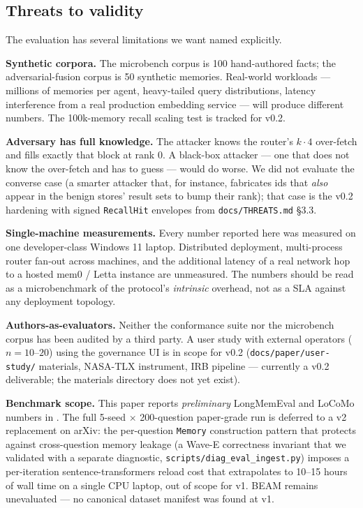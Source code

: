 \documentclass[11pt,letterpaper,twocolumn]{article}
\begin{document}
\subsection{Threats to validity}
\label{sec:eval-threats}

The evaluation has several limitations we want named explicitly.

\textbf{Synthetic corpora.} The microbench corpus is 100 hand-authored facts; the adversarial-fusion corpus is 50 synthetic memories. Real-world workloads --- millions of memories per agent, heavy-tailed query distributions, latency interference from a real production embedding service --- will produce different numbers. The 100k-memory recall scaling test is tracked for v0.2.

\textbf{Adversary has full knowledge.} The  attacker knows the router's $k \cdot 4$ over-fetch and fills exactly that block at rank 0. A black-box attacker --- one that does not know the over-fetch and has to guess --- would do worse. We did not evaluate the converse case (a smarter attacker that, for instance, fabricates ids that \emph{also} appear in the benign stores' result sets to bump their rank); that case is the v0.2 hardening with signed \texttt{RecallHit} envelopes from \texttt{docs/THREATS.md} \S3.3.

\textbf{Single-machine measurements.} Every number reported here was measured on one developer-class Windows 11 laptop. Distributed deployment, multi-process router fan-out across machines, and the additional latency of a real network hop to a hosted mem0 / Letta instance are unmeasured. The numbers should be read as a microbenchmark of the protocol's \emph{intrinsic} overhead, not as a SLA against any deployment topology.

\textbf{Authors-as-evaluators.} Neither the conformance suite nor the microbench corpus has been audited by a third party. A user study with external operators ($n=10$--$20$) using the governance UI is in scope for v0.2 (\texttt{docs/paper/user-study/} materials, NASA-TLX instrument, IRB pipeline --- currently a v0.2 deliverable; the materials directory does not yet exist).

\textbf{Benchmark scope.} This paper reports \emph{preliminary} LongMemEval and LoCoMo numbers in . The full 5-seed $\times$ 200-question paper-grade run is deferred to a v2 replacement on arXiv: the per-question \texttt{Memory} construction pattern that protects against cross-question memory leakage (a Wave-E correctness invariant that we validated with a separate diagnostic, \texttt{scripts/diag\_eval\_ingest.py}) imposes a per-iteration sentence-transformers reload cost that extrapolates to 10--15 hours of wall time on a single CPU laptop, out of scope for v1. BEAM remains unevaluated --- no canonical dataset manifest was found at v1.
\end{document}
